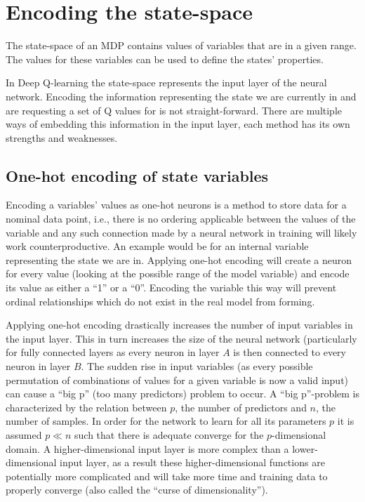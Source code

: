 \section{Encoding the state-space}

The state-space of an MDP contains values of variables that are in a given range. The values for these variables can be used to define the states' properties.

In Deep Q-learning the state-space represents the input layer of the neural network. Encoding the information representing the state we are currently in and are requesting a set of Q values for is not straight-forward. There are multiple ways of embedding this information in the input layer, each method has its own strengths and weaknesses.

\subsection{One-hot encoding of state variables}

Encoding a variables' values as one-hot neurons is a method to store data for a nominal data point, i.e., there is no ordering applicable between the values of the variable and any such connection made by a neural network in training will likely work counterproductive. An example would be for an internal variable representing the state we are in. Applying one-hot encoding will create a neuron for every value (looking at the possible range of the model variable) and encode its value as either a ``1'' or a ``0''. Encoding the variable this way will prevent ordinal relationships which do not exist in the real model from forming.

Applying one-hot encoding drastically increases the number of input variables in the input layer. This in turn increases the size of the neural network (particularly for fully connected layers as every neuron in layer $A$ is then connected to every neuron in layer $B$. The sudden rise in input variables (as every possible permutation of combinations of values for a given variable is now a valid input) can cause a ``big p'' (too many predictors) problem to occur. A ``big p''-problem is characterized by the relation between $p$, the number of predictors and $n$, the number of samples. In order for the network to learn for all its parameters $p$ it is assumed $p \ll n$ such that there is adequate converge for the $p$-dimensional domain. A higher-dimensional input layer is more complex than a lower-dimensional input layer, as a result these higher-dimensional functions are potentially more complicated and will take more time and training data to properly converge (also called the ``curse of dimensionality'').

